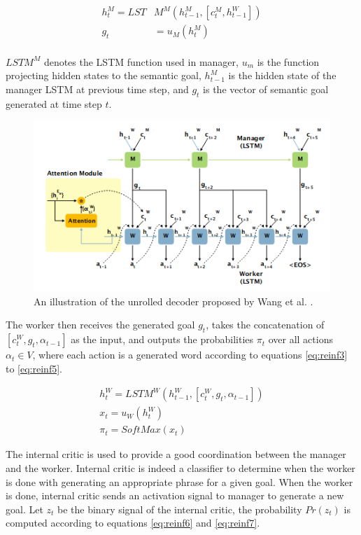 \documentclass[preprint, 12pt]{elsarticle}
\begin{document}
		\begin{align}
			h_t^M = LST&M^M(h_{t-1}^M, [c_t^M, h_{t-1}^W]) \label{eq:reinf1} \\
			g_t &= u_M(h_t^M) \label{eq:reinf2}
		\end{align}
		\\
		$LSTM^M$ denotes the LSTM function used in manager, $u_m$ is the function projecting hidden states to the semantic goal, $h_{t-1}^M$ is the hidden state of the manager LSTM at previous time step, and $g_t$ is the vector of semantic goal generated at time step $t$.
		
		\begin{figure}[h]
		\centering
		\includegraphics[scale=0.8]{Imgs/reinf2.png}
		\caption{An illustration of the unrolled decoder proposed by Wang et al. \cite{wang2018video}.}
		\label{fig:reinf2}
	\end{figure}
	
		The worker then receives the generated goal $g_t$, takes the concatenation of $[c_t^W, g_t, \alpha_{t-1}]$ as the input, and outputs the probabilities $\pi_t$ over all actions $\alpha_t \in V$, where each action is a generated word according to equations \eqref{eq:reinf3} to \eqref{eq:reinf5}.
		
		\begin{align}
			h_t^W = LSTM^W(h_{t-1}^W, [c_t^W, g_t, \alpha_{t-1}]) \label{eq:reinf3} \\
			x_t = u_W(h_t^W) \label{eq:reinf4} \\
			\pi_t = SoftMax(x_t) \label{eq:reinf5} 
		\end{align}
		
		The internal critic is used to provide a good coordination between the manager and the worker. Internal critic is indeed a classifier to determine when the worker is done with generating an appropriate phrase for a given goal. When the worker is done, internal critic sends an activation signal to manager to generate a new goal. Let $z_t$ be the binary signal of the internal critic, the probability $Pr(z_t)$ is computed according to equations \eqref{eq:reinf6} and \eqref{eq:reinf7}.
		
\end{document}
